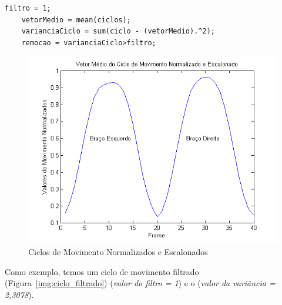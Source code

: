 \begin{description}
\begin{lstlisting}[frame=single, caption=Filtro dos Ciclos]
    filtro = 1;
    vetorMedio = mean(ciclos);
    varianciaCiclo = sum(ciclo - (vetorMedio).^2);
    remocao = varianciaCiclo>filtro;
	\end{lstlisting}
	
	\begin{figure}
     \centering
     \includegraphics[width=1\textwidth]{./img/vetormedionormalozadoescalonado.png}
     \caption{Ciclos de Movimento Normalizados e Escalonados}
		 \label{img:ciclos_normalizado_escalonado}
	\end{figure}
\end{description}




Como exemplo, temos um ciclo de movimento filtrado (Figura~\ref{img:ciclo_filtrado}) (\textit{valor do filtro = 1}) e o (\textit{valor da variância = 2,3078}).

